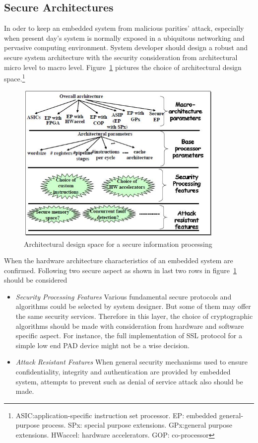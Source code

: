\subsection{Secure Architectures}
In oder to keep an embedded system from malicious parities' attack, especially when present day's system is normally exposed in a ubiquitous networking and pervasive computing environment\cite{embedded_secure}. System developer should design a robust and secure system architecture with the security consideration from architectural micro level to macro level. Figure~\ref{fig:design-space} pictures the choice of architectural design space.\footnote{ASIC:application-specific instruction set processor. EP: embedded general-purpose process. SPx: special purpose extensions. GPx:general purpose extensions. HWaccel: hardware accelerators. GOP: co-processor}
\begin{figure}[htb]
	\centering
	\includegraphics[width=0.9\textwidth]{design-space.jpg}
		\caption{Architectural design space for a secure information processing\cite{embedded_secure}}
	\label{fig:design-space}
\end{figure}


When the hardware architecture characteristics of an embedded system are confirmed. Following two secure aspect as shown in last two rows in figure~\ref{fig:design-space} should be considered
\begin{itemize}
\item \emph{Security Processing Features} Various fundamental secure protocols and algorithms could be selected by system designer. But some of them may offer the same security services. Therefore in this layer, the choice of cryptographic algorithms should be made with consideration from hardware and software specific aspect. For instance, the full implementation of SSL protocol for a simple low end PAD device might not be a wise decision\cite{embedded_secure}.
\item \emph{Attack Resistant Features} When general security mechanisms used to ensure confidentiality, integrity and authentication are provided by embedded system, attempts to prevent such as denial of service attack also should be made.
\end{itemize}